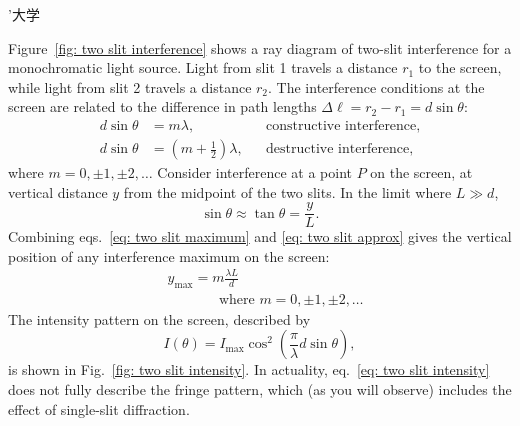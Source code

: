 ’大学\documentclass[addpoints]{physlabs}
\begin{document}
\begin{labsection}
\begin{theory}
    Figure~\ref{fig: two slit interference} shows a ray diagram of two-slit interference for a monochromatic light source. Light from slit 1 travels a distance $r_1$ to the screen, while light from slit 2 travels a distance $r_2$. The interference conditions at the screen are related to the difference in path lengths $\Delta\ell = r_2-r_1 = d\sin{\theta}$:
    \begin{align}
        d\sin{\theta} &= m\lambda, & &\text{constructive interference},
        \label{eq: two slit maximum}
        \\
        d\sin{\theta} &= \left(m+\frac{1}{2}\right)\lambda, & &\text{destructive interference},
        \label{eq: two slit minimum}
    \end{align}
    where $m=0,\pm1,\pm2,\ldots$
    Consider interference at a point $P$ on the screen, at vertical distance $y$ from the midpoint of the two slits. In the limit where $L\gg d$,
    \begin{equation}\label{eq: two slit approx}
        \sin{\theta} \approx \tan{\theta} = \frac{y}{L}.
    \end{equation}
    Combining eqs.~\ref{eq: two slit maximum} and \ref{eq: two slit approx} gives the vertical position of any interference maximum on the screen:
    \begin{align}\label{eq: two slit y position}
        &\boxed{y_\text{max} = m\frac{\lambda L}{d}}\\ 
        &\hspace{40pt}\text{ where  }m=0,\pm 1,\pm2, \dots \nonumber
    \end{align}
    The intensity pattern on the screen, described by
    \begin{equation}\label{eq: two slit intensity}
        I(\theta) = I_\text{max} \cos^2{\left(\frac{\pi}{\lambda}d\sin{\theta}\right)},
    \end{equation}
    is shown in Fig.~\ref{fig: two slit intensity}. In actuality, eq.~\ref{eq: two slit intensity} does not fully describe the fringe pattern, which (as you will observe) includes the effect of single-slit diffraction.


\end{theory}
\end{labsection}
\end{document}
